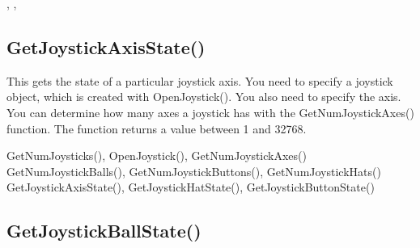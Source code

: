 \documentclass[letterpaper,10pt,english]{sphinxmanual}
\begin{document}
\sphinxAtStartPar
{}

\begin{sphinxVerbatim}[commandchars=\\\{\}]
\end{sphinxVerbatim}

\sphinxAtStartPar
{}

\sphinxAtStartPar
{}, , 

\ignorespaces 

\subsection{GetJoystickAxisState()}
\label{\detokenize{reference/peblenvironment:getjoystickaxisstate}}\label{\detokenize{reference/peblenvironment:index-12}}
\sphinxAtStartPar
{}

\sphinxAtStartPar
{}

\sphinxAtStartPar
This gets the state of a particular joystick axis.  You need to specify a joystick object, which is created with OpenJoystick().  You also need to specify the axis.  You can determine how many axes a joystick has with the GetNumJoystickAxes() function.  The function returns  a value between 1 and 32768.

\sphinxAtStartPar
{}

\sphinxAtStartPar
GetNumJoysticks(), OpenJoystick(), GetNumJoystickAxes() GetNumJoystickBalls(), GetNumJoystickButtons(), GetNumJoystickHats() GetJoystickAxisState(), GetJoystickHatState(), GetJoystickButtonState()

\ignorespaces 

\subsection{GetJoystickBallState()}
\label{\detokenize{reference/peblenvironment:getjoystickballstate}}\label{\detokenize{reference/peblenvironment:index-13}}
\sphinxAtStartPar
{}
\end{document}
